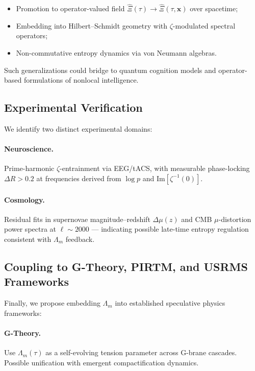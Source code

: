 \documentclass[12pt]{article}
\theoremstyle{plain}
\begin{document}
\begin{itemize}
    \item Promotion to operator-valued field $\hat{\Xi}(\tau) \to \hat{\Xi}(\tau, \mathbf{x})$ over spacetime;
    \item Embedding into Hilbert–Schmidt geometry with $\zeta$-modulated spectral operators;
    \item Non-commutative entropy dynamics via von Neumann algebras.
\end{itemize}

Such generalizations could bridge to quantum cognition models and operator-based formulations of nonlocal intelligence.

\subsection{Experimental Verification}

We identify two distinct experimental domains:

\paragraph{Neuroscience.}
Prime-harmonic $\zeta$-entrainment via EEG/tACS, with measurable phase-locking $\Delta R > 0.2$ at frequencies derived from $\log p$ and $\text{Im}[\zeta^{-1}(0)]$.

\paragraph{Cosmology.}
Residual fits in supernovae magnitude–redshift $\Delta\mu(z)$ and CMB $\mu$-distortion power spectra at $\ell \sim 2000$ — indicating possible late-time entropy regulation consistent with $\Lambda_m$ feedback.

\subsection{Coupling to G-Theory, PIRTM, and USRMS Frameworks}

Finally, we propose embedding $\Lambda_m$ into established speculative physics frameworks:

\paragraph{G-Theory.} 
Use $\Lambda_m(\tau)$ as a self-evolving tension parameter across G-brane cascades. Possible unification with emergent compactification dynamics.
\end{document}
